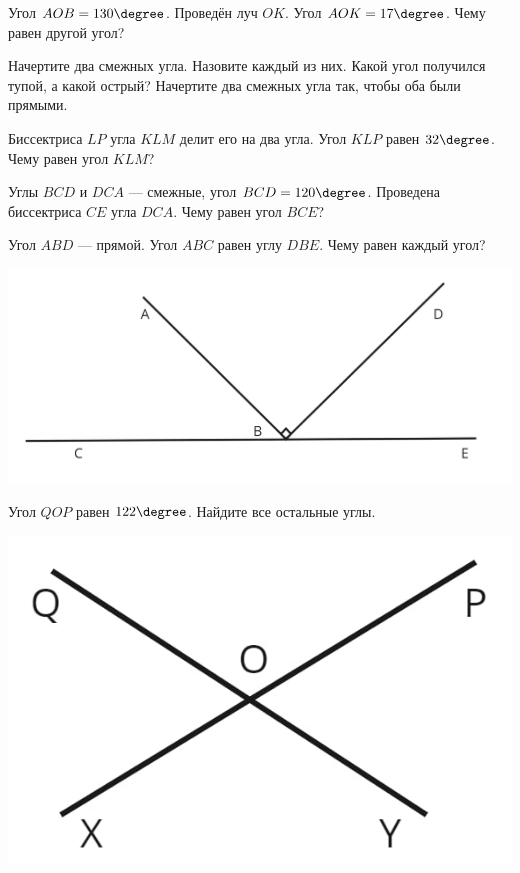 %
%
\begin{homework}[number=2]
	\begin{listofex}
		\item Угол \( AOB=130\degree \). Проведён луч \( OK \). Угол \( AOK=17\degree \). Чему равен другой угол?
		\item Начертите два смежных угла. Назовите каждый из них. Какой угол получился тупой, а какой острый? Начертите два смежных угла так, чтобы оба были прямыми.
		\item Биссектриса \( LP \) угла \( KLM \) делит его на два угла. Угол \( KLP \) равен \( 32\degree \). Чему равен угол \( KLM \)?
		\item Углы \( BCD \) и \( DCA \) --- смежные, угол \( BCD=120\degree \). Проведена биссектриса \( CE \) угла \( DCA \). Чему равен угол \( BCE \)?
		 \item 
		 \begin{minipage}[t]{0.6\linewidth}
		 	Угол \( ABD \) --- прямой. Угол \( ABC \) равен углу \( DBE \). Чему равен каждый угол?
		 \end{minipage}
		 \hspace{0.03\linewidth}
		 \begin{minipage}[c]{0.4\linewidth}
		 	\includegraphics[width=0.9\linewidth]{pics/G51M4H2-1.jpg}
		 \end{minipage}
	 	\item 
	 	\begin{minipage}[t]{0.6\linewidth}
	 		Угол \( QOP \) равен \( 122\degree \). Найдите все остальные углы.
	 	\end{minipage}
	 	\hspace{0.03\linewidth}
	 	\begin{minipage}[c]{0.4\linewidth}
	 		\includegraphics[width=0.9\linewidth]{pics/G51M4H2-2.jpg}

\end{minipage}
\end{listofex}
\end{homework}
